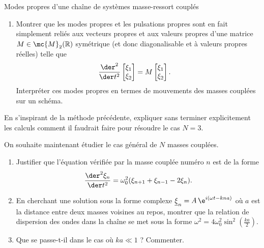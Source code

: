 \begin{exo}[PC][1][TD]{Modes propres d'une chaîne de systèmes masse-ressort couplés}
\begin{quest}
\begin{enumerate}
\item Montrer que les modes propres et les pulsations propres sont en fait simplement reliés aux vecteurs propres et aux valeurs propres d'une matrice $M\in\mc{M}_{2}(\mathbb{R})$ symétrique (et donc diagonalisable et à valeurs propres réelles) telle que
\begin{align}
    \frac{\der^2}{\der t^2}\begin{bmatrix}
           \xi_1 \\
           \xi_2
         \end{bmatrix} &= M \begin{bmatrix}
           \xi_1 \\
           \xi_2
         \end{bmatrix}.
         \end{align}
Interpréter ces modes propres en termes de mouvements des masses couplées sur un schéma.
\end{enumerate}
\item En s'inspirant de la méthode précédente, expliquer sans terminer explicitement les calculs comment il faudrait faire pour résoudre le cas $N=3$.
\item On souhaite maintenant étudier le cas général de $N$ masses couplées.
\begin{enumerate}
\item Justifier que l'équation vérifiée par la masse couplée numéro $n$ est de la forme 
\begin{equation}
  \frac{\der^2\xi_{n}}{\der t^2}=\omega_0^2(\xi_{n+1}+\xi_{n-1}-2\xi_{n}).
\end{equation}
\item En cherchant une solution sous la forme complexe $\underline{\xi}_n = A\,\e^{i(\omega t-kna)}$ où $a$ est la distance entre deux masses voisines au repos, montrer que la relation de dispersion des ondes dans la chaîne se met sous la forme $\omega^2=4\omega_0^2\sin^{2}(\frac{ka}{2})$.
\item Que se passe-t-il dans le cas où $ka\ll 1$ ? Commenter.
\end{enumerate}
\end{quest}
\end{exo}

